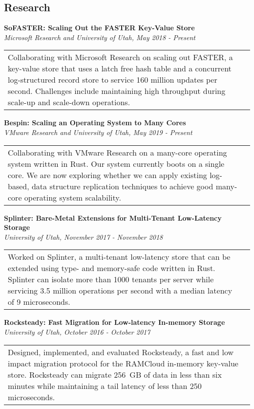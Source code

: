 \documentclass[margin,line]{res}
\begin{document}
\begin{resume}
\section{\sc Research}
{\bf SoFASTER: Scaling Out the FASTER Key-Value Store}\\
{\small\em Microsoft Research and University of Utah, May 2018 - Present}\\
\begin{tabular}{@{}p{5.5in}p{4in}}
{\small Collaborating with Microsoft Research on scaling out FASTER, a
key-value store that uses a latch free hash table and a concurrent
log-structured record
store to service 160 million updates per second. Challenges include
maintaining high throughput during scale-up and scale-down operations.}
\end{tabular}

\vspace{-2.5pt}
{\bf Bespin: Scaling an Operating System to Many Cores}\\
{\small\em VMware Research and University of Utah, May 2019 - Present}\\
\begin{tabular}{@{}p{5.5in}p{4in}}
{\small Collaborating with VMware Research on a many-core operating
system written in Rust. Our system currently boots on a single core. We
are now exploring whether we can apply existing log-based, data
structure replication techniques to achieve good many-core operating
system scalability.}
\end{tabular}

\vspace{-2.5pt}
{\bf Splinter: Bare-Metal Extensions for Multi-Tenant Low-Latency Storage}\\
{\small\em University of Utah, November 2017 - November 2018}\\
\begin{tabular}{@{}p{5.5in}p{4in}}
{\small Worked on Splinter, a multi-tenant low-latency store that can
be extended using type- and memory-safe code written in Rust. Splinter
can isolate more than 1000 tenants per server while servicing 3.5
million operations per second with a median latency of 9 microseconds.}
\end{tabular}

\vspace{-2.5pt}
{\bf Rocksteady: Fast Migration for Low-latency In-memory Storage}\\
{\small\em University of Utah, October 2016 - October 2017}\\
\begin{tabular}{@{}p{5.5in}p{4in}}
{\small Designed, implemented, and evaluated Rocksteady, a fast and
low impact migration protocol for the RAMCloud in-memory
key-value store. Rocksteady can migrate 256~GB of data in less
than six minutes while maintaining a tail latency of less than
250 microseconds.}
\end{tabular}


\end{resume}
\end{document}
